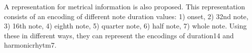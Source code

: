 
A representation for metrical information is also proposed.
This representation consists of an encoding of different
note duration values: 1) onset, 2) 32nd note, 3) 16th note,
4) eighth note, 5) quarter note, 6) half note, 7) whole
note. Using these in different ways, they can represent the
encodings of \gls{duration14} and \gls{harmonicrhytm7}.
